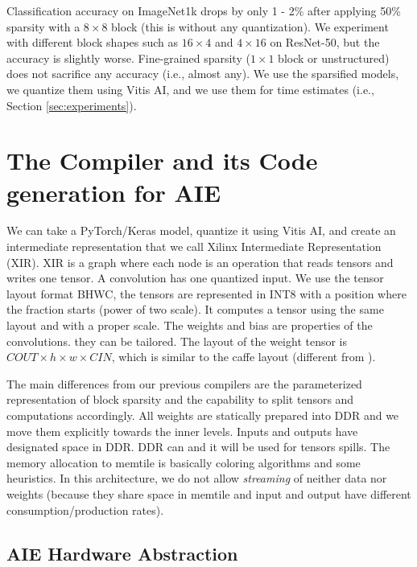 \documentclass[sigconf]{acmart}
\begin{document}
Classification accuracy on ImageNet1k drops by only 1 - 2\% after
applying 50\% sparsity with a $8\times 8$ block (this is without any
quantization). We experiment with different block shapes such as
$16\times 4$ and $4\times 16$ on ResNet-50, but the accuracy is
slightly worse. Fine-grained sparsity ($1\times 1$ block or
unstructured) does not sacrifice any accuracy (i.e., almost any).  We
use the sparsified models, we quantize them using Vitis AI, and we use
them for time estimates (i.e., Section \ref{sec:experiments}).


\section{The Compiler and its Code generation for AIE}
\label{sec:compiler}
We can take a PyTorch/Keras model, quantize it using Vitis AI, and
create an intermediate representation that we call Xilinx Intermediate
Representation (XIR). XIR is a graph where each node is an operation
that reads tensors and writes one tensor.  A convolution has one
quantized input.  We use the tensor layout format BHWC, the tensors
are represented in INT8 with a position where the fraction starts
(power of two scale). It computes a tensor using the same layout and
with a proper scale. The weights and bias are properties of the
convolutions. they can be tailored.  The layout of the weight tensor
is $COUT\times h \times w \times CIN$, which is similar to the caffe
layout \cite{Caffe} (different from \cite{tensorflow}). 
\begin{comment}
  (previously DPUV1 and DPUV3int8
  \cite{10.11451/3473334,abs-2110-04327}).
\end{comment}

The main differences from our previous compilers are the parameterized
representation of block sparsity and the capability to split tensors
and computations accordingly. All weights are statically prepared into
DDR and we move them explicitly towards the inner levels. Inputs and
outputs have designated space in DDR. DDR can and it will be used for
tensors spills.  The memory allocation to memtile is basically
coloring algorithms and some heuristics. In this architecture, we do
not allow {\em streaming} of neither data nor weights (because they
share space in memtile and input and output have different
consumption/production rates).

\subsection{AIE Hardware Abstraction}
\end{document}
